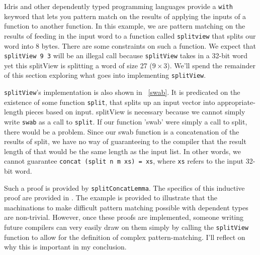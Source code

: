 Idris and other dependently typed programming languages provide a \texttt{with}
keyword that lets you pattern match on the results of applying the inputs of a
function to another function. In this example, we are pattern matching on the
results of feeding in the input word to a function called \texttt{splitview}
that splits our word into 8 bytes. There are some constraints on such a
function. We expect that \texttt{splitView 9 3} will be an illegal call because
\texttt{splitView} takes in a 32-bit word yet this splitView is splitting a word
of size 27 ($9 \times 3$). We'll spend the remainder of this section exploring
what goes into implementing \texttt{splitView}. 

\texttt{splitView}'s implementation is also shown in ~\ref{swab}. It is
predicated on the existence of some function \texttt{split}, that splits up an
input vector into appropriate-length pieces based on input. splitView is
necessary because we cannot simply write \texttt{swab} as a call to
\texttt{split}. If our function 'swab' were simply a call to split, there would
be a problem. Since our swab function is a concatenation of the results of
split, we have no way of guaranteeing to the compiler that the result length of
that would be the same length as the input list. In other words, we cannot
guarantee \texttt{concat (split n m xs) = xs}, where \texttt{xs} refers to the
input 32-bit word. 

Such a proof is provided by \texttt{splitConcatLemma}. The specifics of this
inductive proof are provided in \cite{power_of_pi}. The example is provided to
illustrate that the machinations to make difficult pattern matching possible with dependent types are non-trivial. However, once these proofs are implemented, someone writing future compilers can very easily draw on them simply by calling the \texttt{splitView} function to allow for the definition of complex pattern-matching. I'll reflect on why this is important in my conclusion. 